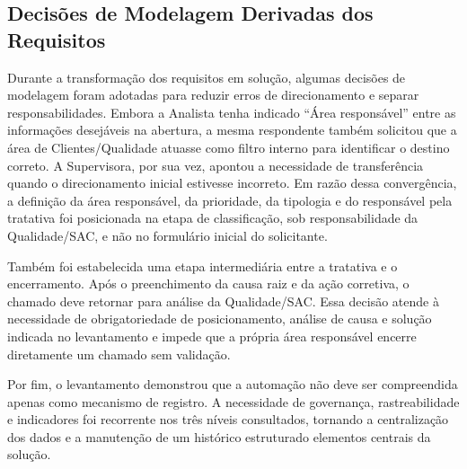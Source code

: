\subsection{Decisões de Modelagem Derivadas dos Requisitos}

Durante a transformação dos requisitos em solução, algumas
decisões de modelagem foram adotadas para reduzir erros de
direcionamento e separar responsabilidades. Embora a
Analista tenha indicado ``Área responsável'' entre as
informações desejáveis na abertura, a mesma respondente
também solicitou que a área de Clientes/Qualidade atuasse
como filtro interno para identificar o destino correto.
A Supervisora, por sua vez, apontou a necessidade de
transferência quando o direcionamento inicial estivesse
incorreto. Em razão dessa convergência, a definição da área
responsável, da prioridade, da tipologia e do responsável
pela tratativa foi posicionada na etapa de classificação,
sob responsabilidade da Qualidade/SAC, e não no formulário
inicial do solicitante.

Também foi estabelecida uma etapa intermediária entre a
tratativa e o encerramento. Após o preenchimento da causa
raiz e da ação corretiva, o chamado deve retornar para
análise da Qualidade/SAC. Essa decisão atende à necessidade
de obrigatoriedade de posicionamento, análise de causa e
solução indicada no levantamento e impede que a própria área
responsável encerre diretamente um chamado sem validação.

Por fim, o levantamento demonstrou que a automação não deve
ser compreendida apenas como mecanismo de registro. A
necessidade de governança, rastreabilidade e indicadores
foi recorrente nos três níveis consultados, tornando a
centralização dos dados e a manutenção de um histórico
estruturado elementos centrais da solução.
